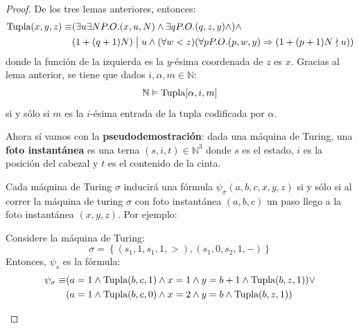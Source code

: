 \documentclass[12pt]{report}
\newcounter{it}
\theoremstyle{largebreak}
\newcommand\divides{\ensuremath{\bigm|}}
\begin{document}
\begin{proof}
        De los tres lemas anteriores, entonces:
        \begin{equation*}
            \begin{split}
                \textup{Tupla}(x,y,z)\equiv&(\exists u\exists N P.O.(x,u,N)\land\exists q P.O.(q,z,y)\land )\land\\
                &(1+(q+1)N)\divides u\land (\forall w<z)(\forall p P.O.(p,w,y)\Rightarrow (1+(p+1)N\nmid u))\\
            \end{split}
        \end{equation*}
        donde la función de la izquierda es la $y$-ésima coordenada de $z$ es $x$. Gracias al lema anterior, se tiene que dados $i,\alpha,m\in\mathbb{N}$:
        \begin{equation*}
            \mathbb{N}\vDash \textup{Tupla}[\alpha,i,m]
        \end{equation*}
        si y sólo si $m$ es la $i$-ésima entrada de la tupla codificada por $\alpha$.

        Ahora sí vamos con la \textbf{pseudodemostración}: dada una máquina de Turing, una \textbf{foto instantánea} es una terna $(s,i,t)\in\mathbb{N}^3$ donde $s$ es el estado, $i$ es la posición del cabezal y $t$ es el contenido de la cinta.
        
        Cada máquina de Turing $\sigma$ inducirá una fórmula $\psi_\sigma(a,b,c,x,y,z)$ si y sólo si al correr la máquina de turing $\sigma$ con foto instantánea $(a,b,c)$ un paso llego a la foto instantánea $(x,y,z)$. Por ejemplo:

        \begin{exa}
            Considere la máquina de Turing:
            \begin{equation*}
                \sigma=\left\{(s_1,1,s_1,1,>),(s_1,0,s_2,1,-) \right\}
            \end{equation*}
            Entonces, $\psi_s$ es la fórmula:
            \begin{equation*}
                \begin{split}
                    \psi_\sigma\equiv&(a = 1\land \textup{Tupla}(b,c,1)\land x=1\land y=b+1\land \textup{Tupla}(b,z,1))\lor\\
                    &(a=1\land \textup{Tupla}(b,c,0)\land x=2\land y=b\land \textup{Tupla}(b,z,1))\\
                \end{split}
            \end{equation*}
        \end{exa}


\end{proof}
\end{document}
